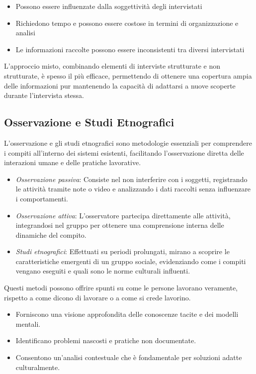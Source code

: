 \begin{tcolorbox}[colback=red!5!white,colframe=red!75!black, title=Contro delle interviste]
    \begin{itemize}
        \item Possono essere influenzate dalla soggettività degli intervistati
        \item Richiedono tempo e possono essere costose in termini di organizzazione e
        analisi
        \item Le informazioni raccolte possono essere inconsistenti tra diversi intervistati
    \end{itemize}
\end{tcolorbox}

L'approccio misto, combinando elementi di interviste strutturate e non strutturate, è
spesso il più efficace, permettendo di ottenere una copertura ampia delle informazioni
pur mantenendo la capacità di adattarsi a nuove scoperte durante l'intervista stessa.
\subsection{Osservazione e Studi Etnografici}

L'osservazione e gli studi etnografici sono metodologie essenziali per comprendere i
compiti all'interno dei sistemi esistenti, facilitando l'osservazione diretta delle
interazioni umane e delle pratiche lavorative.

\begin{itemize}
    \item \textit{Osservazione passiva}: Consiste nel non interferire con i soggetti,
    registrando le attività tramite note o
    video e analizzando i dati raccolti senza influenzare i comportamenti.
    \item \textit{Osservazione attiva}: L'osservatore partecipa direttamente alle attività,
    integrandosi nel gruppo per ottenere una comprensione interna delle dinamiche del compito.
    \item \textit{Studi etnografici}: Effettuati su periodi prolungati, mirano a scoprire le
    caratteristiche emergenti di un gruppo sociale, evidenziando come i compiti vengano
    eseguiti e quali sono le norme culturali influenti.
\end{itemize}

Questi metodi possono offrire spunti su come le persone lavorano veramente, rispetto a come
dicono di lavorare o a come si crede lavorino.

\begin{tcolorbox}[colback=green!5!white,colframe=green!75!black, title=Vantaggi
    dell'osservazione e degli studi etnografici]
    \begin{itemize}
        \item Forniscono una visione approfondita delle conoscenze tacite e dei modelli
        mentali.
        \item Identificano problemi nascosti e pratiche non documentate.
        \item Consentono un'analisi contestuale che è fondamentale per soluzioni adatte
        culturalmente.
    \end{itemize}
\end{tcolorbox}

